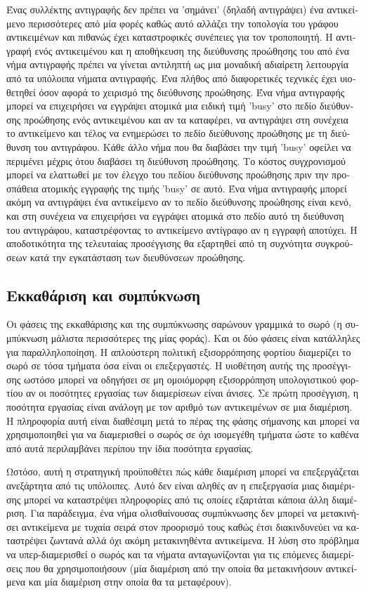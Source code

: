 \begin{greek}
Ένας συλλέκτης αντιγραφής δεν πρέπει να 'σημάνει' (δηλαδή
αντιγράψει) ένα αντικείμενο περισσότερες από μία φορές καθώς
αυτό αλλάζει την τοπολογία του γράφου αντικειμένων και πιθανώς
έχει καταστροφικές συνέπειες για τον τροποποιητή. Η αντιγραφή
ενός αντικειμένου και η αποθήκευση της διεύθυνσης προώθησης
του από ένα νήμα αντιγραφής πρέπει να γίνεται αντιληπτή ως
μια μοναδική αδιαίρετη λειτουργία από τα υπόλοιπα νήματα
αντιγραφής. Ένα πλήθος από διαφορετικές τεχνικές έχει υιοθετηθεί
όσον αφορά το χειρισμό της διεύθυνσης προώθησης. Ένα νήμα
αντιγραφής μπορεί να επιχειρήσει να εγγράψει ατομικά μια ειδική
τιμή 'busy' στο πεδίο διεύθυνσης προώθησης ενός αντικειμένου
και αν τα καταφέρει, να αντιγράψει στη συνέχεια το αντικείμενο
και τέλος να ενημερώσει το πεδίο διεύθυνσης προώθησης με
τη διεύθυνση του αντιγράφου. Κάθε άλλο νήμα που θα διαβάσει
την τιμή 'busy' οφείλει να περιμένει μέχρις ότου διαβάσει
τη διεύθυνση προώθησης. Το κόστος συγχρονισμού μπορεί να
ελαττωθεί με τον έλεγχο του πεδίου διεύθυνσης προώθησης
πριν την προσπάθεια ατομικής εγγραφής της τιμής 'busy'
σε αυτό. Ένα νήμα αντιγραφής μπορεί ακόμη να αντιγράψει
ένα αντικείμενο αν το πεδίο διεύθυνσης προώθησης είναι
κενό, και στη συνέχεια να επιχειρήσει να εγγράψει ατομικά
στο πεδίο αυτό τη διεύθυνση του αντιγράφου, καταστρέφοντας
το αντικείμενο αντίγραφο αν η εγγραφή αποτύχει. Η αποδοτικότητα
της τελευταίας προσέγγισης θα εξαρτηθεί από τη συχνότητα
συγκρούσεων κατά την εγκατάσταση των διευθύνσεων προώθησης.

\subsection{Εκκαθάριση και συμπύκνωση}
Οι φάσεις της εκκαθάρισης και της συμπύκνωσης σαρώνουν γραμμικά
το σωρό (η συμπύκνωση μάλιστα περισσότερες της μίας φοράς). Και
οι δύο φάσεις είναι κατάλληλες για παραλληλοποίηση. Η απλούστερη
πολιτική εξισορρόπησης φορτίου διαμερίζει το σωρό σε τόσα τμήματα
όσα είναι οι επεξεργαστές. Η υιοθέτηση αυτής της προσέγγισης
ωστόσο μπορεί να οδηγήσει σε μη ομοιόμορφη εξισορρόπηση υπολογιστικού
φορτίου αν οι ποσότητες εργασίας των διαμερίσεων είναι άνισες.
Σε πρώτη προσέγγιση, η ποσότητα εργασίας είναι ανάλογη με τον
αριθμό των αντικειμένων σε μια διαμέριση. Η πληροφορία αυτή
είναι διαθέσιμη μετά το πέρας της φάσης σήμανσης και μπορεί
να χρησιμοποιηθεί για να διαμερισθεί ο σωρός σε όχι ισομεγέθη
τμήματα ώστε το καθένα από αυτά περιλαμβάνει περίπου την ίδια
ποσότητα εργασίας.

Ωστόσο, αυτή η στρατηγική προϋποθέτει πώς κάθε διαμέριση μπορεί
να επεξεργάζεται ανεξάρτητα από τις υπόλοιπες. Αυτό δεν είναι
αληθές αν η επεξεργασία μιας διαμέρισης μπορεί να καταστρέψει
πληροφορίες από τις οποίες εξαρτάται κάποια άλλη διαμέριση.
Για παράδειγμα, ένα νήμα ολισθαίνουσας συμπύκνωσης δεν μπορεί
να μετακινήσει αντικείμενα με τυχαία σειρά στον προορισμό τους
καθώς έτσι διακινδυνεύει να καταστρέψει ζωντανά αλλά όχι ακόμη
μετακινηθέντα αντικείμενα. Η λύση στο πρόβλημα να υπερ-διαμερισθεί
ο σωρός και τα νήματα ανταγωνίζονται για τις επόμενες διαμερίσεις
που θα χρησιμοποιήσουν (μία διαμέριση από την οποία θα μετακινήσουν
αντικείμενα και μία διαμέριση στην οποία θα τα μεταφέρουν).


\end{greek}
